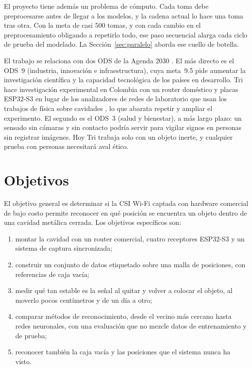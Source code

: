 \documentclass[10pt,journal]{IEEEtran}
\begin{document}
El proyecto tiene además un problema de cómputo. Cada toma debe preprocesarse antes de llegar a los modelos, y la cadena actual lo hace una toma tras otra. Con la meta de casi 500 tomas, y con cada cambio en el preprocesamiento obligando a repetirlo todo, ese paso secuencial alarga cada ciclo de prueba del modelado. La Sección~\ref{sec:paralelo} aborda ese cuello de botella.

El trabajo se relaciona con dos ODS de la Agenda 2030 \cite{onu2015agenda}. El más directo es el ODS~9 (industria, innovación e infraestructura), cuya meta~9.5 pide aumentar la investigación científica y la capacidad tecnológica de los países en desarrollo. Tri hace investigación experimental en Colombia con un router doméstico y placas ESP32-S3 en lugar de los analizadores de redes de laboratorio que usan los trabajos de física sobre cavidades \cite{delhougne2021deeply}, lo que abarata repetir y ampliar el experimento. El segundo es el ODS~3 (salud y bienestar), a más largo plazo: un sensado sin cámaras y sin contacto podría servir para vigilar signos en personas sin registrar imágenes. Hoy Tri trabaja solo con un objeto inerte, y cualquier prueba con personas necesitará aval ético.

\section{Objetivos}\label{sec:objetivos}
El objetivo general es determinar si la CSI Wi-Fi captada con hardware comercial de bajo costo permite reconocer en qué posición se encuentra un objeto dentro de una cavidad metálica cerrada. Los objetivos específicos son:
\begin{enumerate}
    \item montar la cavidad con un router comercial, cuatro receptores ESP32-S3 y un sistema de captura sincronizada;
    \item construir un conjunto de datos etiquetado sobre una malla de posiciones, con referencias de caja vacía;
    \item medir qué tan estable es la señal al quitar y volver a colocar el objeto, al moverlo pocos centímetros y de un día a otro;
    \item comparar métodos de reconocimiento, desde el vecino más cercano hasta redes neuronales, con una evaluación que no mezcle datos de entrenamiento y de prueba;
    \item reconocer también la caja vacía y las posiciones que el sistema nunca ha visto.
\end{enumerate}
\end{document}
